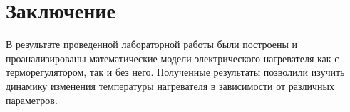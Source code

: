 \pagebreak

\section{Заключение}
	В результате проведенной лабораторной работы были построены и проанализированы математические модели электрического нагревателя как с терморегулятором, так и без него. Полученные результаты позволили изучить динамику изменения температуры нагревателя в зависимости от различных параметров. 

\pagebreak